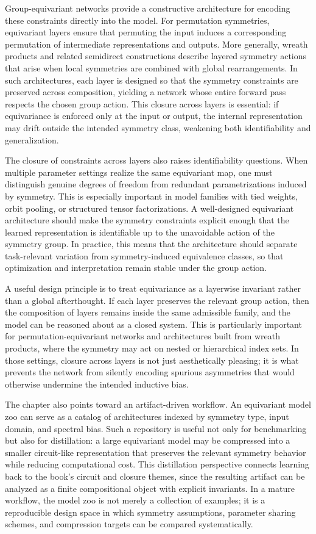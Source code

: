 Group-equivariant networks provide a constructive architecture for encoding these constraints directly into the model. For permutation symmetries, equivariant layers ensure that permuting the input induces a corresponding permutation of intermediate representations and outputs. More generally, wreath products and related semidirect constructions describe layered symmetry actions that arise when local symmetries are combined with global rearrangements. In such architectures, each layer is designed so that the symmetry constraints are preserved across composition, yielding a network whose entire forward pass respects the chosen group action. This closure across layers is essential: if equivariance is enforced only at the input or output, the internal representation may drift outside the intended symmetry class, weakening both identifiability and generalization.

The closure of constraints across layers also raises identifiability questions. When multiple parameter settings realize the same equivariant map, one must distinguish genuine degrees of freedom from redundant parametrizations induced by symmetry. This is especially important in model families with tied weights, orbit pooling, or structured tensor factorizations. A well-designed equivariant architecture should make the symmetry constraints explicit enough that the learned representation is identifiable up to the unavoidable action of the symmetry group. In practice, this means that the architecture should separate task-relevant variation from symmetry-induced equivalence classes, so that optimization and interpretation remain stable under the group action.

A useful design principle is to treat equivariance as a layerwise invariant rather than a global afterthought. If each layer preserves the relevant group action, then the composition of layers remains inside the same admissible family, and the model can be reasoned about as a closed system. This is particularly important for permutation-equivariant networks and architectures built from wreath products, where the symmetry may act on nested or hierarchical index sets. In those settings, closure across layers is not just aesthetically pleasing; it is what prevents the network from silently encoding spurious asymmetries that would otherwise undermine the intended inductive bias.

The chapter also points toward an artifact-driven workflow. An equivariant model zoo can serve as a catalog of architectures indexed by symmetry type, input domain, and spectral bias. Such a repository is useful not only for benchmarking but also for distillation: a large equivariant model may be compressed into a smaller circuit-like representation that preserves the relevant symmetry behavior while reducing computational cost. This distillation perspective connects learning back to the book's circuit and closure themes, since the resulting artifact can be analyzed as a finite compositional object with explicit invariants. In a mature workflow, the model zoo is not merely a collection of examples; it is a reproducible design space in which symmetry assumptions, parameter sharing schemes, and compression targets can be compared systematically.

